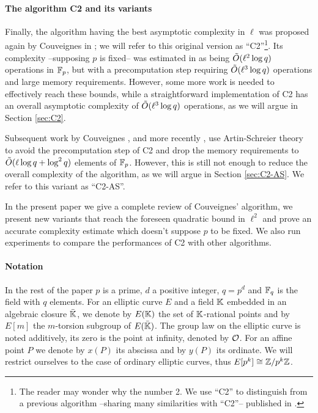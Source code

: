 \paragraph{The algorithm C2 and its variants}
Finally, the algorithm having the best asymptotic complexity in $\ell$
was proposed again by Couveignes in \cite{Cou96}; we will refer to
this original version as ``C2''\footnote{The reader may wonder why the
  number 2. We use ``C2'' to distinguish from a previous algorithm
  --sharing many similarities with ``C2''-- published in
  \cite{Cou94}.}. Its complexity --supposing $p$ is fixed-- was
estimated in \cite{Cou96} as being $\tilde{O}(\ell^2\log q)$ operations
in $\mathbb{F}_p$, but with a precomputation step requiring $\tilde{O}(\ell^3\log
q)$ operations and large memory requirements. However, some more work
is needed to effectively reach these bounds, while a straightforward
implementation of C2 has an overall asymptotic complexity of
$\tilde{O}(\ell^3\log q)$ operations, as we will argue in Section
\ref{sec:C2}.

Subsequent work by Couveignes \cite{Cou00}, and more recently
\cite{DFS09}, use Artin-Schreier theory to avoid the precomputation
step of C2 and drop the memory requirements to $\tilde{O}(\ell\log q +
\log^2 q)$ elements of $\mathbb{F}_p$. However, this is still not enough to
reduce the overall complexity of the algorithm, as we will argue in
Section \ref{sec:C2-AS}. We refer to this variant as ``C2-AS''.

In the present paper we give a complete review of Couveignes'
algorithm, we present new variants that reach the foreseen quadratic
bound in $\ell^2$ and prove an accurate complexity estimate which
doesn't suppose $p$ to be fixed. We also run experiments to compare
the performances of C2 with other algorithms.

\paragraph{Notation}
In the rest of the paper $p$ is a prime, $d$ a positive integer,
$q=p^d$ and $\mathbb{F}_q$ is the field with $q$ elements. For an elliptic
curve $E$ and a field $\mathbb{K}$ embedded in an algebraic closure
$\bar{\mathbb{K}}$, we denote by $E(\mathbb{K})$ the set of $\mathbb{K}$-rational points and
by $E[m]$ the $m$-torsion subgroup of $E(\bar{\mathbb{K}})$. The group law on
the elliptic curve is noted additively, its zero is the point at
infinity, denoted by $\mathcal{O}$. For an affine point $P$ we denote by $x(P)$
its abscissa and by $y(P)$ its ordinate. We will restrict ourselves to
the case of ordinary elliptic curves, thus $E[p^k]\cong\mathbb{Z}/p^k\mathbb{Z}$.

